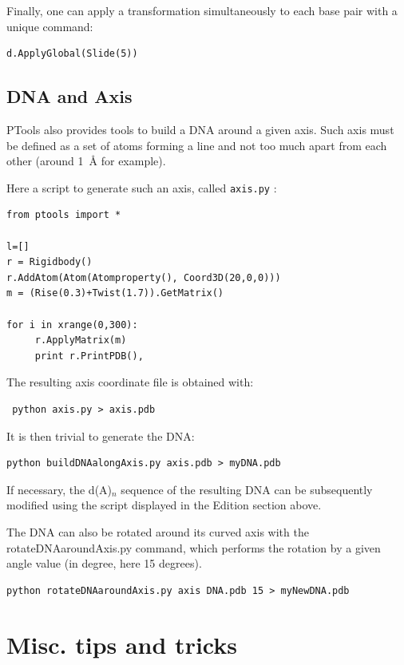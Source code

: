 \documentclass[12pt,a4paper]{article}
\begin{document}
Finally, one can apply a transformation simultaneously to each base pair with a unique command:
\begin{verbatim}
d.ApplyGlobal(Slide(5)) 
\end{verbatim}
    
\subsection{DNA and Axis}
PTools also provides tools to build a DNA around a given axis. Such axis must be defined as a set of atoms forming a line and not too much apart from each other (around 1~{\AA} for example).

Here a script to generate such an axis, called \texttt{axis.py} :

\begin{verbatim}
from ptools import *

l=[]
r = Rigidbody()
r.AddAtom(Atom(Atomproperty(), Coord3D(20,0,0)))
m = (Rise(0.3)+Twist(1.7)).GetMatrix()

for i in xrange(0,300):
     r.ApplyMatrix(m)
     print r.PrintPDB(),
\end{verbatim} 

The resulting axis coordinate file is obtained with:
\begin{verbatim}
 python axis.py > axis.pdb
\end{verbatim}


It is then trivial to generate the DNA:

\begin{verbatim}
python buildDNAalongAxis.py axis.pdb > myDNA.pdb
\end{verbatim} 


If necessary, the d(A)$_n$ sequence of the resulting DNA can be subsequently modified using the script displayed in the Edition section above. 

The DNA can also be rotated around its curved axis with the rotateDNAaroundAxis.py command, which performs the rotation by a given angle value (in degree, here 15 degrees).

\begin{verbatim}
python rotateDNAaroundAxis.py axis DNA.pdb 15 > myNewDNA.pdb
\end{verbatim} 



\newpage
\section{Misc. tips and tricks}
\end{document}
